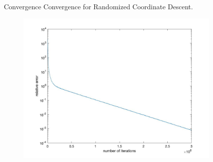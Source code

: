 \documentclass[final, 20pt]{beamer}
\newlength{\sepwid}
\newlength{\onecolwid}
\begin{document}
\begin{frame}[t]
\begin{columns}[t]
\begin{column}{\onecolwid}
\begin{block}{Convergence}
Convergence for Randomized Coordinate Descent. 
\begin{flushleft}
\begin{figure}
	\centering
	\includegraphics[scale=0.7]{cd_pd_convergence}
\end{figure}
\end{flushleft}

\end{block}



\end{column}
\begin{column}{\sepwid}\end{column} %

\begin{column}{\onecolwid} %


\end{column}
\end{columns}
\end{frame}
\end{document}
